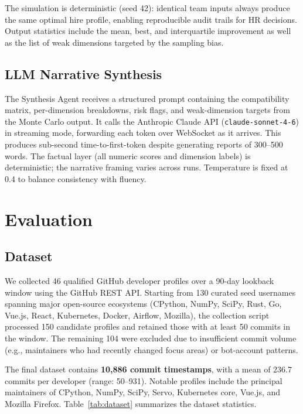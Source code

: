 \documentclass[conference]{IEEEtran}
\begin{document}
The simulation is deterministic (seed 42): identical team inputs
always produce the same optimal hire profile, enabling reproducible
audit trails for HR decisions.  Output statistics include the mean,
best, and interquartile improvement as well as the list of weak
dimensions targeted by the sampling bias.

\subsection{LLM Narrative Synthesis}

The Synthesis Agent receives a structured prompt containing the
compatibility matrix, per-dimension breakdowns, risk flags, and
weak-dimension targets from the Monte Carlo output.  It calls the
Anthropic Claude API (\texttt{claude-sonnet-4-6}) in streaming mode,
forwarding each token over WebSocket as it arrives.  This produces
sub-second time-to-first-token despite generating reports of
300--500 words.  The factual layer (all numeric scores and
dimension labels) is deterministic; the narrative framing
varies across runs.  Temperature is fixed at 0.4 to balance
consistency with fluency.

\section{Evaluation}
\label{sec:eval}

\subsection{Dataset}

We collected 46 qualified GitHub developer profiles over a 90-day
lookback window using the GitHub REST API.  Starting from 130 curated
seed usernames spanning major open-source ecosystems (CPython,
NumPy, SciPy, Rust, Go, Vue.js, React, Kubernetes, Docker, Airflow,
Mozilla), the collection script processed 150 candidate profiles and
retained those with at least 50 commits in the window.  The
remaining 104 were excluded due to insufficient commit volume
(e.g., maintainers who had recently changed focus areas) or
bot-account patterns.

The final dataset contains \textbf{10,886 commit timestamps}, with
a mean of 236.7 commits per developer (range: 50--931).  Notable
profiles include the principal maintainers of CPython, NumPy, SciPy,
Servo, Kubernetes core, Vue.js, and Mozilla Firefox.
Table~\ref{tab:dataset} summarizes the dataset statistics.
\end{document}
